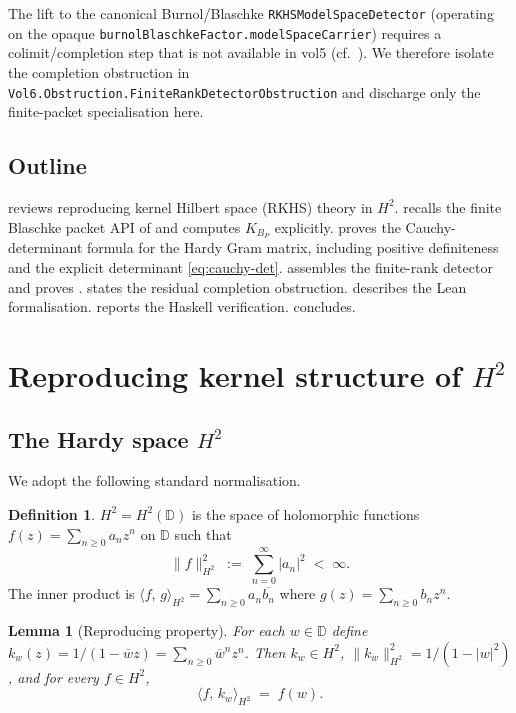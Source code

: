 \documentclass[12pt]{article}
\newtheorem{lemma}[theorem]{Lemma}
\theoremstyle{definition}
\newtheorem{definition}[theorem]{Definition}
\theoremstyle{remark}
\newcommand{\D}{\mathbb{D}}
\newcommand{\HHH}{H^{2}}
\newcommand{\KBP}{K_{B_{P}}}
\newcommand{\inner}[2]{\langle #1,\,#2\rangle}
\newcommand{\norm}[1]{\lVert #1 \rVert}
\newcommand{\abs}[1]{\lvert #1 \rvert}
\newcommand{\conj}[1]{\overline{#1}}
\begin{document}
The lift to the canonical Burnol/Blaschke
\texttt{RKHSModelSpaceDetector} (operating on the opaque
\texttt{burnolBlaschkeFactor.modelSpaceCarrier}) requires a colimit/completion
step that is not available in vol5 (cf.~\cite[RF-05]{Vol6KB}). We therefore
isolate the completion obstruction in
\texttt{Vol6.Obstruction.FiniteRankDetectorObstruction} and discharge only
the finite-packet specialisation here.

\subsection{Outline}

 reviews reproducing kernel Hilbert space (RKHS) theory in
$\HHH$.  recalls the finite Blaschke packet API of
\cite{Vol6Paper01} and computes $\KBP$ explicitly.
 proves the Cauchy-determinant formula for the Hardy
Gram matrix, including positive definiteness and the explicit determinant
\eqref{eq:cauchy-det}.  assembles the finite-rank
detector and proves .
 states the residual completion obstruction.
 describes the Lean formalisation.
 reports the Haskell verification.
 concludes.

\section{Reproducing kernel structure of \texorpdfstring{$\HHH$}{H2}}\label{sec:rkhs}

\subsection{The Hardy space \texorpdfstring{$\HHH$}{H2}}

We adopt the following standard normalisation.

\begin{definition}\label{def:H2}
$\HHH=\HHH(\D)$ is the space of holomorphic functions
$f(z)=\sum_{n\ge0}a_{n}z^{n}$ on $\D$ such that
\[
  \norm{f}_{\HHH}^{2}\;:=\;\sum_{n=0}^{\infty}\abs{a_{n}}^{2}\;<\;\infty.
\]
The inner product is
$\inner{f}{g}_{\HHH}=\sum_{n\ge0}a_{n}\conj{b_{n}}$ where
$g(z)=\sum_{n\ge0}b_{n}z^{n}$.
\end{definition}

\begin{lemma}[Reproducing property]\label{lem:reprod}
For each $w\in\D$ define $k_{w}(z)=1/(1-\conj{w}z)=\sum_{n\ge0}\conj{w}^{n}z^{n}$.
Then $k_{w}\in\HHH$, $\norm{k_{w}}_{\HHH}^{2}=1/(1-\abs{w}^{2})$, and
for every $f\in\HHH$,
\[
  \inner{f}{k_{w}}_{\HHH}\;=\;f(w).
\]
\end{lemma}
\end{document}

